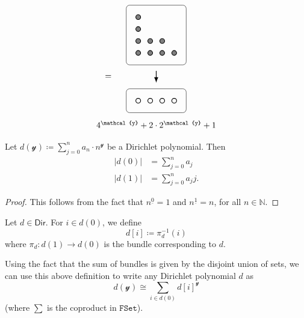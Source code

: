 \documentclass[11pt,fleqn]{article}
\newcommand{\yon}{\mathcal{y}}
\newcommand{\cat}[1]{\mathtt{#1}}
\newcommand{\rig}[1]{\mathsf{#1}}
\newcommand{\FSet}{\cat{FSet}}
\newcommand{\Dir}{\rig{Dir}}
\begin{document}
\begin{example}
\[\begin{tikzpicture}[scale=0.5]
      \node at (10.5,-1) {$=$};
      \begin{scope}[shift={(12,0)}]
        \begin{scope}
          \draw[rounded corners] (0,0) rectangle ++(5,5);
          \foreach \y in {1,2,3,4}
            \draw[thick,black,fill=gray] (1,\y) circle (2mm);
          \foreach \y in {1,2}
            \draw[thick,black,fill=gray] (2,\y) circle (2mm);
          \foreach \y in {1,2}
            \draw[thick,black,fill=gray] (3,\y) circle (2mm);
          \draw[thick,black,fill=gray] (4,1) circle (2mm);
        \end{scope}
        \draw[thick,-Latex] (2.5,-0.5) to (2.5,-1.5);
        \begin{scope}[shift={(0,-4)}]
          \draw[rounded corners] (0,0) rectangle ++(5,2);
          \foreach \x in {1,2,3,4}
          \draw[thick,black,fill=white] (\x,1) circle (2mm);
        \end{scope}
        \node at (2.5,-5) {$4^\yon+2\cdot2^\yon+1$};
      \end{scope}
    \end{tikzpicture}
  \]
\end{example}

\begin{lemma}
\label{lemma:d0-and-d1-from-sum-form}
  Let $d(\yon)\coloneqq\sum_{j=0}^n a_n\cdot n^\yon$ be a Dirichlet polynomial.
  Then
  \[
    \begin{aligned}
      |d(0)| &= \sum\nolimits_{j=0}^n a_j
    \\|d(1)| &= \sum\nolimits_{j=0}^n a_j j.
    \end{aligned}
  \]
\end{lemma}

\begin{proof}
  This follows from the fact that $n^{\underline{0}}=1$ and $n^{\underline{1}}=n$, for all $n\in\mathbb{N}$.
\end{proof}

\begin{definition}
\label{definition:fibre-notation}
  Let $d\in\Dir$.
  For $i\in d(0)$, we define
  \[
    d[i] \coloneqq \pi_d^{-1}(i)
  \]
  where $\pi_d\colon d(1)\to d(0)$ is the bundle corresponding to $d$.
\end{definition}

Using the fact that the sum of bundles is given by the disjoint union of sets, we can use this above definition to write any Dirichlet polynomial $d$ as
\[
  d(\yon) \cong \sum_{i\in d(0)} d[i]^\yon
\]
(where $\sum$ is the coproduct in $\FSet$).
\end{document}
